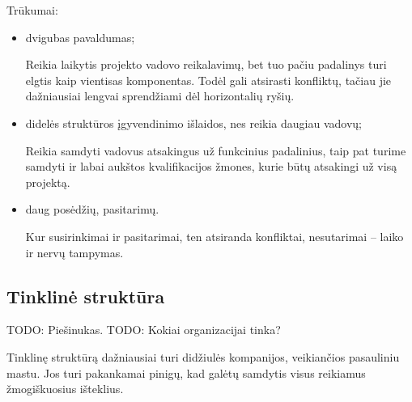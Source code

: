 Trūkumai:
\begin{itemize}
  \item dvigubas pavaldumas;
    \begin{note}
      Reikia laikytis projekto vadovo reikalavimų, bet tuo pačiu
      padalinys turi elgtis kaip vientisas komponentas. Todėl gali
      atsirasti konfliktų, tačiau jie dažniausiai lengvai sprendžiami
      dėl horizontalių ryšių.
    \end{note}
  \item didelės struktūros įgyvendinimo išlaidos, nes reikia daugiau
    vadovų;
    \begin{note}
      Reikia samdyti vadovus atsakingus už funkcinius padalinius, taip
      pat turime samdyti ir labai aukštos kvalifikacijos žmones, kurie
      būtų atsakingi už visą projektą.
    \end{note}
  \item daug posėdžių, pasitarimų.
    \begin{note}
      Kur susirinkimai ir pasitarimai, ten atsiranda konfliktai,
      nesutarimai – laiko ir nervų tampymas.
    \end{note}
\end{itemize}

\subsection{Tinklinė struktūra}

TODO: Piešinukas.
TODO: Kokiai organizacijai tinka?

Tinklinę struktūrą dažniausiai turi didžiulės kompanijos, veikiančios
pasauliniu mastu. Jos turi pakankamai pinigų, kad galėtų samdytis
visus reikiamus žmogiškuosius išteklius.

